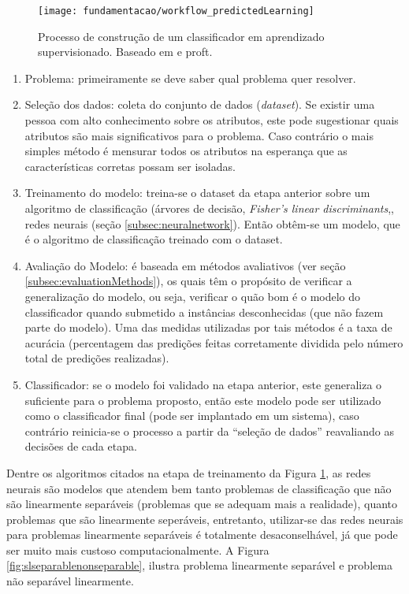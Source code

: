 \begin{figure}[!htb] \centering 
  \centering
  \texttt{[image: fundamentacao/workflow\_predictedLearning]} 
  \caption{Processo de construção de um classificador em aprendizado supervisionado. Baseado em \cite{Kotsiantis:2007} e proft\footnotemark {}.} 
  \label{fig:slclassification}
\end{figure}

\begin{enumerate}
\item Problema: primeiramente se deve saber qual problema quer resolver.
\item Seleção dos dados: coleta do conjunto de dados (\textit{dataset}). Se existir uma pessoa com alto conhecimento sobre os atributos, este pode sugestionar quais atributos são mais significativos para o problema. Caso contrário o mais simples método é mensurar todos os atributos na esperança que as características corretas possam ser isoladas.\cite{Kotsiantis:2007}
\item Treinamento do modelo: treina-se o dataset da etapa anterior sobre um algoritmo de classificação (árvores de decisão, \textit{Fisher’s linear discriminants},\cite{Michie:1994}, redes neurais (seção \ref{subsec:neuralnetwork}). Então obtêm-se um modelo, que é o algoritmo de classificação treinado com o dataset.
\item Avaliação do Modelo: é baseada em métodos avaliativos (ver seção \ref{subsec:evaluationMethods}), os quais têm o propósito de verificar a generalização do modelo, ou seja, verificar o quão bom é o modelo do classificador quando submetido a instâncias desconhecidas (que não fazem parte do modelo). Uma das medidas utilizadas por tais métodos é a taxa de acurácia (percentagem das predições feitas corretamente dividida pelo número total de predições realizadas).\cite{Kotsiantis:2007}
\item Classificador: se o modelo foi validado na etapa anterior, este generaliza o suficiente para o problema proposto, então este modelo pode ser utilizado como o classificador final (pode ser implantado em um sistema), caso contrário reinicia-se o processo a partir da ``seleção de dados'' reavaliando as decisões de cada etapa.
\end{enumerate}

Dentre os algoritmos citados na etapa de treinamento da Figura \ref{fig:slclassification}, as redes neurais são modelos que atendem bem tanto problemas de classificação que não são linearmente separáveis (problemas que se adequam mais a realidade), quanto problemas que são linearmente seperáveis, entretanto, utilizar-se das redes neurais para problemas linearmente separáveis é totalmente desaconselhável, já que pode ser muito mais custoso computacionalmente.\cite{Zhang:2000}\cite{Elizondo:2006} A Figura \ref{fig:slseparablenonseparable}, ilustra problema linearmente separável e problema não separável linearmente.

